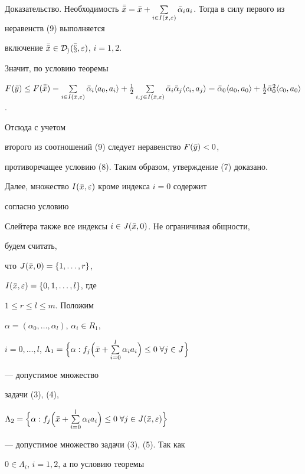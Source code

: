 \begin{pf*}{Доказательство. Необходимость}
$\Bar{\Bar x}=\Bar x+\sum\limits_{i\in I(\Bar x,\varepsilon)}\Bar


\alpha_ia_i$. Тогда в силу первого из неравенств (9) выполняется


включение $\Bar{\Bar x}\in\cal D_i(\Bar x,\varepsilon)$, $i=1,2$.


Значит, по условию теоремы


$F(\Bar y)\le F(\Bar{\Bar x})=\sum\limits_{i\in I(\Bar x,\varepsilon)}


\Bar \alpha_i\la a_0,a_i\ra+\frac{1}{2}\sum\limits_{i,j\in I(\Bar


x,\varepsilon)}\Bar \alpha_i\Bar\alpha_j\la c_i,a_j\ra=\Bar\alpha_0


\la a_0,a_0\ra+\frac{1}{2}\Bar\alpha^2_0\la c_0,a_0\ra$.


Отсюда с учетом


второго из соотношений (9) следует неравенство $F(\Bar y)<0$,


противоречащее условию (8). Таким образом, утверждение (7) доказано.





Далее, множество $I(\Bar x,\varepsilon)$ кроме индекса $i=0$ содержит


согласно условию


Слейтера также все индексы $i\in J(\Bar x,0)$. Не ограничивая общности,


будем считать,


что $J(\Bar x,0)=\{1,\dotsc,r\}$,


$I(\Bar x,\varepsilon)=\{0,1,\dotsc,l\}$, где


$1\le r\le l\le m$. Положим


$\alpha=(\alpha_0,\dotsc,\alpha_l)$, $\alpha_i\in R_1$,


$i=0,\dotsc,l$, $\Lambda_1=\Bigl\{\alpha:f_j\Bigl(\Bar x+


\sum\limits^l_{i=0}\alpha_ia_i\Bigr)\le 0\;\forall j\in J\Bigr\}$


--- допустимое множество


задачи (3), (4),


$\Lambda_2=\Bigl\{\alpha:f_j\Bigl(\Bar x+


\sum\limits^l_{i=0}\alpha_ia_i\Bigr)\le 0\;\forall j\in


J(\Bar x,\varepsilon)\Bigr\}$


--- допустимое множество задачи (3), (5). Так как


$0\in\Lambda_i$, $i=1,2$, а по условию теоремы



\end{pf*}
